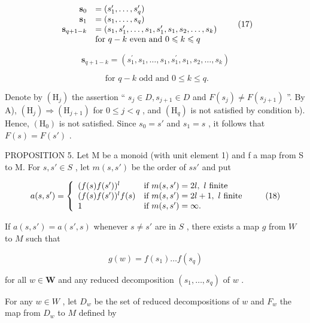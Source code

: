\[
\begin{array}{r l} \mathbf {s} _ {0} & = (s _ {1} ^ {\prime}, \dots , s _ {q} ^ {\prime}) \\ \mathbf {s} _ {1} & = (s _ {1}, \dots , s _ {q}) \\ \mathbf {s} _ {q + 1 - k} & = (s _ {1}, s _ {1} ^ {\prime}, \dots , s _ {1}, s _ {1} ^ {\prime}, s _ {1}, s _ {2}, \dots , s _ {k}) \\ & \text {for } q - k \text { even and } 0 \leqslant k \leqslant q \end{array}\tag{17}
\]

\[
\mathbf {s} _ {q + 1 - k} = \left(s _ {1} ^ {\prime}, s _ {1}, \ldots , s _ {1}, s _ {1} ^ {\prime}, s _ {1}, s _ {2}, \ldots , s _ {k}\right)
\]

\[
\text { for   } q - k \text {   odd   and   } 0 \leqslant k \leqslant q.
\]

Denote by \((\mathrm{H}_{j})\) the assertion `` \(s_{j} \in D, s_{j+1} \in D\) and \(F(s_{j}) \neq F(s_{j+1})\) ''. By A), \((\mathrm{H}_{j}) \Longrightarrow (\mathrm{H}_{j+1})\) for \(0 \leqslant j < q\) , and \((\mathrm{H}_{q})\) is not satisfied by condition b). Hence, \((\mathrm{H}_{0})\) is not satisfied. Since \(s_{0} = s'\) and \(s_{1} = s\) , it follows that \(F(s) = F(s')\) .

PROPOSITION 5. Let M be a monoid (with unit element 1) and f a map from S to M. For \(s, s' \in S\) , let \(m(s, s')\) be the order of \(ss'\) and put

\[
a (s, s ^ {\prime}) = \left\{ \begin{array}{l l} (f (s) f (s ^ {\prime})) ^ {l} & \text {if } m(s,s^{\prime}) = 2l,\ l \text { finite} \\ (f (s) f (s ^ {\prime})) ^ {l} f (s) & \text {if } m(s,s^{\prime}) = 2l + 1,\ l \text { finite} \\ 1 & \text {if } m(s,s^{\prime}) = \infty . \end{array} \right.\tag{18}
\]

If \(a(s, s') = a(s', s)\) whenever \(s \neq s'\) are in \(S\) , there exists a map \(g\) from \(W\) to \(M\) such that

\[
g (w) = f \left(s _ {1}\right) \dots f \left(s _ {q}\right)\tag{19}
\]

for all \(w \in \mathbf{W}\) and any reduced decomposition \((s_1, \ldots, s_q)\) of \(w\) .

For any \(w \in W\) , let \(D_w\) be the set of reduced decompositions of \(w\) and \(F_w\) the map from \(D_w\) to \(M\) defined by

